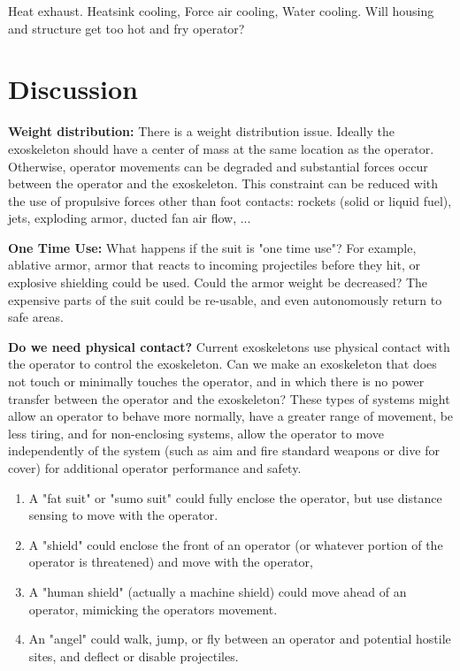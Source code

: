 \documentclass[letterpaper,12pt,fullpage]{article}
\begin{document}
Heat exhaust. Heatsink cooling, Force air cooling, Water cooling.
Will housing and structure get too hot and fry operator?

\section{Discussion}

{\bf Weight distribution:}
There is a weight distribution issue. Ideally the exoskeleton should
have a center of mass at the same location as the operator. Otherwise,
operator movements can be degraded and substantial forces occur between
the operator and the exoskeleton.
This constraint can be reduced with the use of propulsive forces other
than foot contacts: rockets (solid or liquid fuel), jets, exploding armor,
ducted fan air flow, ...

{\bf One Time Use:}
What happens if the suit is "one time use"? For example, ablative armor,
armor that reacts to incoming projectiles before they hit,
or explosive shielding could be used. Could the armor weight be decreased?
The expensive parts of the suit could be re-usable, and even autonomously
return to safe areas.

{\bf Do we need physical contact?}
Current exoskeletons use physical contact with the operator to control
the exoskeleton. Can we make an exoskeleton that does not touch or
minimally touches the operator, and in which there is no power
transfer between the operator and the exoskeleton? These types of
systems might allow an operator to behave more normally, have a
greater range of movement, be less tiring, and for non-enclosing
systems, allow the operator to move independently of the system (such
as aim and fire standard weapons or dive for cover) for additional
operator performance and safety.
\begin{enumerate}
\item
A "fat suit" or "sumo suit" could fully enclose the operator, but
use distance sensing to move with the operator.
\item
A "shield" could enclose the front of an operator (or whatever
portion of the operator is threatened) and move with the operator,
\item
A "human shield" (actually a machine shield) could move ahead of
an operator, mimicking the operators movement.
\item
An "angel" could walk, jump, or fly between an operator and potential
hostile sites, and deflect or disable projectiles.
\end{enumerate}
\end{document}
